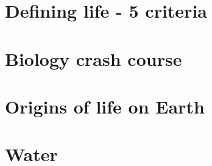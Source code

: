 \documentclass[DIV=calc, paper=a4, fontsize=12pt]{scrartcl}	 %
\begin{document}
\section*{Defining life - 5 criteria}

\begin{multicols}{2}




\end{multicols}

\section*{Biology crash course}

\begin{multicols}{2}



\end{multicols}

\section*{Origins of life on Earth}

\begin{multicols}{2}




\end{multicols}

\section*{Water}

\begin{multicols}{2}










\pagebreak

\end{multicols}
\end{document}
